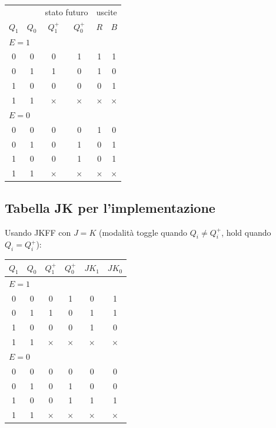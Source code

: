 \documentclass[11pt,a4paper]{report}
\begin{document}
\begin{center}
\begin{tabular}{cc|cc|cc}
\toprule
\multicolumn{2}{c|}{} & \multicolumn{2}{c|}{stato futuro} & \multicolumn{2}{c}{uscite}\\
$Q_1$ & $Q_0$ & $Q_1^+$ & $Q_0^+$ & $R$ & $B$\\
\midrule
\multicolumn{6}{l}{$E=1$}\\
\midrule
0 & 0 & 0 & 1 & 1 & 1\\
0 & 1 & 1 & 0 & 1 & 0\\
1 & 0 & 0 & 0 & 0 & 1\\
1 & 1 & $\times$ & $\times$ & $\times$ & $\times$\\
\midrule
\multicolumn{6}{l}{$E=0$}\\
\midrule
0 & 0 & 0 & 0 & 1 & 0\\
0 & 1 & 0 & 1 & 0 & 1\\
1 & 0 & 0 & 1 & 0 & 1\\%
1 & 1 & $\times$ & $\times$ & $\times$ & $\times$\\
\bottomrule
\end{tabular}
\end{center}

\subsection{Tabella JK per l'implementazione}

Usando JKFF con $J=K$ (modalità toggle quando $Q_i \neq Q_i^+$, hold quando $Q_i = Q_i^+$):

\begin{center}
\begin{tabular}{cc|cc|cc}
\toprule
$Q_1$ & $Q_0$ & $Q_1^+$ & $Q_0^+$ & $JK_1$ & $JK_0$\\
\midrule
\multicolumn{6}{l}{$E=1$}\\
\midrule
0 & 0 & 0 & 1 & 0 & 1\\
0 & 1 & 1 & 0 & 1 & 1\\
1 & 0 & 0 & 0 & 1 & 0\\
1 & 1 & $\times$ & $\times$ & $\times$ & $\times$\\
\midrule
\multicolumn{6}{l}{$E=0$}\\
\midrule
0 & 0 & 0 & 0 & 0 & 0\\%
0 & 1 & 0 & 1 & 0 & 0\\
1 & 0 & 0 & 1 & 1 & 1\\
1 & 1 & $\times$ & $\times$ & $\times$ & $\times$\\
\bottomrule
\end{tabular}
\end{center}
\end{document}
